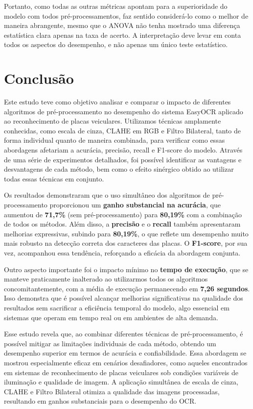 \documentclass[conference]{IEEEtran}
\begin{document}
Portanto, como todas as outras métricas apontam para a superioridade do modelo  com todos pré-processamentos, faz sentido considerá-lo como o melhor de maneira abrangente, mesmo que o ANOVA não tenha mostrado uma diferença estatística clara apenas na taxa de acerto. A interpretação deve levar em conta todos os aspectos do desempenho, e não apenas um único teste estatístico.

\section{Conclusão}

Este estudo teve como objetivo analisar e comparar o impacto de diferentes algoritmos de pré-processamento no desempenho do sistema EasyOCR aplicado ao reconhecimento de placas veiculares. Utilizamos técnicas amplamente conhecidas, como escala de cinza, CLAHE em RGB e Filtro Bilateral, tanto de forma individual quanto de maneira combinada, para verificar como essas abordagens afetariam a acurácia, precisão, recall e F1-score do modelo. Através de uma série de experimentos detalhados, foi possível identificar as vantagens e desvantagens de cada método, bem como o efeito sinérgico obtido ao utilizar todas essas técnicas em conjunto.

Os resultados demonstraram que o uso simultâneo dos algoritmos de pré-processamento proporcionou um \textbf{ganho substancial na acurácia}, que aumentou de \textbf{71,7\%} (sem pré-processamento) para \textbf{80,19\%} com a combinação de todos os métodos. Além disso, a \textbf{precisão} e o \textbf{recall} também apresentaram melhorias expressivas, subindo para \textbf{80,19\%}, o que reflete um desempenho muito mais robusto na detecção correta dos caracteres das placas. O \textbf{F1-score}, por sua vez, acompanhou essa tendência, reforçando a eficácia da abordagem conjunta.

Outro aspecto importante foi o impacto mínimo no \textbf{tempo de execução}, que se manteve praticamente inalterado ao utilizarmos todos os algoritmos concomitantemente, com a média de execução permanecendo em \textbf{7,26 segundos}. Isso demonstra que é possível alcançar melhorias significativas na qualidade dos resultados sem sacrificar a eficiência temporal do modelo, algo essencial em sistemas que operam em tempo real ou em ambientes de alta demanda.

Esse estudo revela que, ao combinar diferentes técnicas de pré-processamento, é possível mitigar as limitações individuais de cada método, obtendo um desempenho superior em termos de acurácia e confiabilidade. Essa abordagem se mostrou especialmente eficaz em cenários desafiadores, como aqueles encontrados em sistemas de reconhecimento de placas veiculares sob condições variáveis de iluminação e qualidade de imagem. A aplicação simultânea de escala de cinza, CLAHE e Filtro Bilateral otimiza a qualidade das imagens processadas, resultando em ganhos substanciais para o desempenho do OCR.
\end{document}
